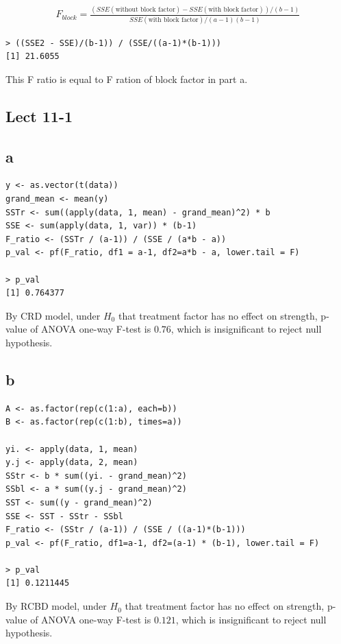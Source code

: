 \documentclass[11pt,letterpaper]{article}
\begin{document}
\begin{align*}
F_{block} = \frac{(SSE(\text{without block factor}) - SSE(\text{with block factor}) )  / (b - 1)}{SSE(\text{with block factor})  / (a - 1)(b - 1)}
\end{align*}
\begin{verbatim}
> ((SSE2 - SSE)/(b-1)) / (SSE/((a-1)*(b-1)))
[1] 21.6055
\end{verbatim}
\noindent This F ratio is equal to F ration of block factor in part a.

\subsection*{Lect 11-1}
\subsection*{a}
\begin{verbatim}
y <- as.vector(t(data))
grand_mean <- mean(y)
SSTr <- sum((apply(data, 1, mean) - grand_mean)^2) * b
SSE <- sum(apply(data, 1, var)) * (b-1)
F_ratio <- (SSTr / (a-1)) / (SSE / (a*b - a))
p_val <- pf(F_ratio, df1 = a-1, df2=a*b - a, lower.tail = F)

> p_val
[1] 0.764377
\end{verbatim}
\noindent By CRD model, under $H_0$ that treatment factor has no effect on strength, p-value of ANOVA one-way F-test is $0.76$, which is insignificant to reject null hypothesis. 

\subsection*{b}
\begin{verbatim}
A <- as.factor(rep(c(1:a), each=b))
B <- as.factor(rep(c(1:b), times=a))

yi. <- apply(data, 1, mean)
y.j <- apply(data, 2, mean)
SStr <- b * sum((yi. - grand_mean)^2)
SSbl <- a * sum((y.j - grand_mean)^2)
SST <- sum((y - grand_mean)^2)
SSE <- SST - SStr - SSbl
F_ratio <- (SStr / (a-1)) / (SSE / ((a-1)*(b-1)))
p_val <- pf(F_ratio, df1=a-1, df2=(a-1) * (b-1), lower.tail = F)

> p_val
[1] 0.1211445
\end{verbatim}
\noindent By RCBD model, under $H_0$ that treatment factor has no effect on strength, p-value of ANOVA one-way F-test is $0.121$, which is insignificant to reject null hypothesis. 
\end{document}
